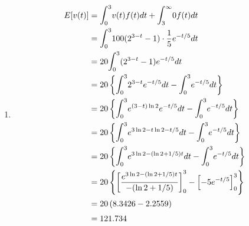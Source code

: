 \documentclass{article}
\begin{document}
\begin{enumerate}
     \item
      \begin{align*}
       E[v(t)] &= \mathlarger{\int}_0^3{v(t)f(t)dt} + \mathlarger{\int}_3^\infty{0f(t)dt} \\
	&= \mathlarger{\int}_0^3{100(2^{3-t}-1)\cdot\dfrac{1}{5}e^{-t/5}dt} \\
	&= 20 \mathlarger{\int}_0^3{(2^{3-t}-1)e^{-t/5}dt} \\
	&= 20 \left\{\mathlarger{\int}_0^3{2^{3-t}e^{-t/5}dt}-\mathlarger{\int}_0^3{e^{-t/5}dt}\right\} \\
	&= 20 \left\{\mathlarger{\int}_0^3{e^{(3-t)\ln{2}}e^{-t/5}dt}-\mathlarger{\int}_0^3{e^{-t/5}dt}\right\} \\
	&= 20 \left\{\mathlarger{\int}_0^3{e^{3\ln{2}-t\ln{2}-t/5}dt}-\mathlarger{\int}_0^3{e^{-t/5}dt}\right\} \\
	&= 20 \left\{\mathlarger{\int}_0^3{e^{3\ln{2}-(\ln{2}+1/5)t}dt}-\mathlarger{\int}_0^3{e^{-t/5}dt}\right\} \\
	&= 20 \left\{\left[\dfrac{e^{3\ln{2}-(\ln{2}+1/5)t}}{-(\ln{2}+1/5)}\right]_0^3 - \left[-5e^{-t/5}\right]_0^3\right\} \\
	&= 20 \left(8.3426 - 2.2559 \right) \\
	&= 121.734
      \end{align*}

    \end{enumerate}
\end{document}
